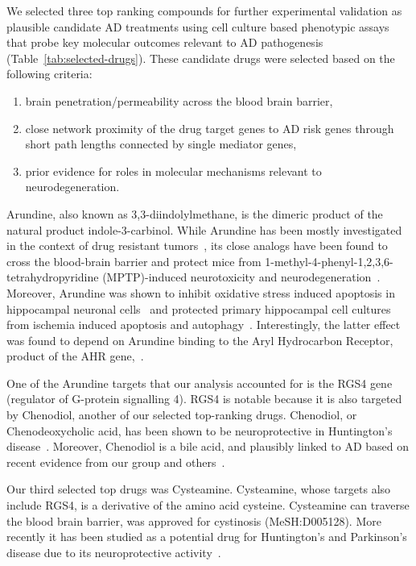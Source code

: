 \documentclass[letterpaper]{article}
\begin{document}
We selected three top ranking compounds for further experimental validation as
plausible candidate AD treatments using cell culture based phenotypic assays
that probe key molecular outcomes relevant to AD pathogenesis
(Table~\ref{tab:selected-drugs}). These candidate drugs were selected based on the following criteria:
\begin{enumerate}
  \item brain penetration/permeability across the blood brain barrier,
  \item close network proximity of the drug target genes to AD risk genes through short path lengths connected by single mediator genes,
  \item prior evidence for roles in molecular mechanisms relevant to neurodegeneration.
\end{enumerate}

Arundine, also known as 3,3-diindolylmethane, is the dimeric product of the
natural product indole-3-carbinol.  While Arundine has been mostly
investigated in the context of drug resistant tumors~\citep{Biersack2020}, its
close analogs have been found to cross the blood-brain barrier and protect
mice from 1-methyl-4-phenyl-1,2,3,6-tetrahydropyridine (MPTP)-induced neurotoxicity and
neurodegeneration~\citep{DeMiranda2013}.
Moreover, Arundine was shown to inhibit oxidative stress induced apoptosis in
hippocampal neuronal cells~\citep{Lee2019} and protected primary hippocampal
cell cultures from ischemia induced apoptosis and
autophagy~\citep{Rzemieniec2019}.  Interestingly, the latter effect was found
to depend on Arundine binding to the Aryl Hydrocarbon Receptor, product of the
AHR gene,~\citep{Rzemieniec2019}.

One of the Arundine targets that our analysis accounted for is the RGS4 gene
(regulator of G-protein signalling 4). RGS4 is notable because it is also
targeted by Chenodiol, another of our selected top-ranking drugs.  Chenodiol,
or Chenodeoxycholic acid, has been shown to be neuroprotective in Huntington's
disease~\citep{Keene2002}.  Moreover, Chenodiol is a bile acid, and plausibly
linked to AD based on recent evidence from our group and
others~\citep{Varma2021,Baloni2020}.

Our third selected top drugs was Cysteamine.  Cysteamine, whose targets also
include RGS4, is a derivative of the amino acid cysteine.  Cysteamine can
traverse the blood brain barrier, was approved for cystinosis (MeSH:D005128).
More recently it has been studied as a potential drug for Huntington's and
Parkinson's disease due to its neuroprotective
activity~\citep{Besouw2013,Paul2019}.
\end{document}
